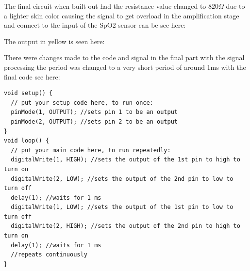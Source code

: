 \documentclass{article}
\begin{document}
\newpage
The final circuit when built out had the resistance value changed to $820\Omega$ due to a lighter skin color causing the signal to get overload in the amplification stage and connect to the input of the SpO2 sensor can be see here:
\begin{center}
\end{center}
The output in yellow is seen here:
\begin{center}
\end{center}
\newpage
There were changes made to the code and signal in the final part with the signal processing the period was changed to a very short period of around 1ms with the final code see here:
\begin{lstlisting}[language=Arduino, caption=SpO2 Pulsing Code]
void setup() {
  // put your setup code here, to run once:
  pinMode(1, OUTPUT); //sets pin 1 to be an output
  pinMode(2, OUTPUT); //sets pin 2 to be an output
}
void loop() {
  // put your main code here, to run repeatedly:
  digitalWrite(1, HIGH); //sets the output of the 1st pin to high to turn on 
  digitalWrite(2, LOW); //sets the output of the 2nd pin to low to turn off
  delay(1); //waits for 1 ms
  digitalWrite(1, LOW); //sets the output of the 1st pin to low to turn off
  digitalWrite(2, HIGH); //sets the output of the 2nd pin to high to turn on
  delay(1); //waits for 1 ms
  //repeats continuously
}
\end{lstlisting}
\newpage
\end{document}
